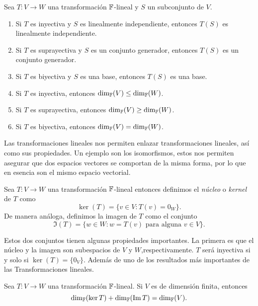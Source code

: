 \begin{teor}
  Sea $T\colon V \to W$ una transformación $\mathbb{F}$-lineal y $S$ un subconjunto de $V$.
  \begin{enumerate}
    \item Si $T$ es inyectiva y $S$ es linealmente independiente, entonces $T(S)$ es linealmente independiente.
    \item Si $T$ es suprayectiva y $S$ es un conjunto generador, entonces $T(S)$ es un conjunto generador.
    \item Si $T$ es biyectiva y $S$ es una base, entonces $T(S)$ es una base.
    \item Si $T$ es inyectiva, entonces $\dim_{\mathbb{F}} (V) \leq \dim_{\mathbb{F}}(W)$.
    \item Si $T$ es suprayectiva, entonces $\dim_{\mathbb{F}} (V) \geq \dim_{\mathbb{F}}(W)$.
    \item Si $T$ es biyectiva, entonces $\dim_{\mathbb{F}} (V) = \dim_{\mathbb{F}}(W)$.
  \end{enumerate}
\end{teor}

Las transformaciones lineales nos permiten enlazar transformaciones lineales, así como sus propiedades. Un ejemplo son los isomorfismos, estos nos permiten asegurar que dos espacios vectores se comportan de la misma forma, por lo que en esencia son el mismo espacio vectorial.

\begin{defi}
  Sea $T\colon V \to W$ una transformación $\mathbb{F}$-lineal entonces definimos el \emph{núcleo} o \emph{kernel}  de $T$ como
    \[ \ker(T) = \{ v \in V : T(v) = 0_W \}.\]
  De manera análoga, definimos la imagen de $T$ como el conjunto
    \[ \Im(T) = \{w \in W : w = T(v) \text{ para alguna } v \in V \}. \]
\end{defi}

Estos dos conjuntos tienen algunas propiedades importantes. La primera es que el núcleo y la imagen son subespacios de $V$ y $W$,respectivamente. $T$ será inyectiva si y solo si $\ker(T) = \{0_V\}$. Además de uno de los resultados más importantes de las Transformaciones lineales.
\begin{teor}
  Sea $T \colon V \to W$ una transformación $\mathbb{F}$-lineal. Si $V$ es de dimensión finita, entonces
    \[  \dim_{\mathbb{F}}( \ker T )  + \dim_{\mathbb{F}}( \operatorname{Im} T) = \dim_{\mathbb{F}} (V). \]
\end{teor}